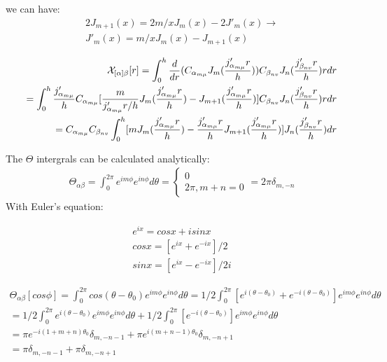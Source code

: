 \documentclass{Note}
\begin{document}
we can have:
\begin{equation}
\begin{aligned}
2J_{m+1}(x)=2m/x J_m(x)-2J'_m(x)\rightarrow \\
J'_m(x)=m/x J_m(x)-J_{m+1}(x)
\end{aligned}
\end{equation}

\begin{equation}
\begin{aligned}
\mathcal{X}_{[\alpha]\beta}[r]=\int_0^h {d\over dr}(C_{\alpha_{m\mu}} J_m({j'_{\alpha_{m\mu}}r\over h}))C_{\beta_{nv}} J_n({j'_{\beta_{nv}}r\over h})r dr\\
=\int_0^h {j'_{\alpha_{m\mu}}\over h} C_{\alpha_{m\mu}} [{m\over {j'_{\alpha_{m\mu}}r/ h}} J_m({j'_{\alpha_{m\mu}}r\over h})- J_{m+1}({j'_{\alpha_{m\mu}}r\over h})]C_{\beta_{nv}} J_n({j'_{\beta_{nv}}r\over h})r dr\\
=C_{\alpha_{m\mu}}C_{\beta_{nv}} \int_0^h[{m} J_m({j'_{\alpha_{m\mu}}r\over h})-{j'_{\alpha_{m\mu}}r\over h} J_{m+1}({j'_{\alpha_{m\mu}}r\over h})] J_n({j'_{\beta_{nv}}r\over h})dr\\
\end{aligned}
\end{equation}

The $\Theta$ intergrals can be calculated analytically:
\begin{equation}
\begin{aligned}
\Theta_{\alpha\beta}=\int_0^{2\pi} e^{im\phi} e^{in\phi} d\theta=\left\{\begin{matrix}
0\\
2\pi, m+n=0
\end{matrix}\right.
=2\pi \delta_{m,-n}
\end{aligned}
\end{equation}
With Euler's equation:

\begin{equation}
\begin{aligned}
e^{ix}=cosx+isinx\\
cosx=[e^{ix}+e^{-ix}]/2\\
sinx=[e^{ix}-e^{-ix}]/2i
\end{aligned}
\end{equation}

\begin{equation}
\begin{aligned}
\Theta_{\alpha\beta}[cos\phi]=\int_0^{2\pi} cos(\theta-\theta_0) e^{im\phi} e^{in\phi} d\theta=1/2\int_0^{2\pi} [e^{i(\theta-\theta_0)}+e^{-i(\theta-\theta_0)}] e^{im\phi} e^{in\phi} d\theta\\
=1/2\int_0^{2\pi} e^{i(\theta-\theta_0)} e^{im\phi} e^{in\phi} d\theta+1/2\int_0^{2\pi} [e^{-i(\theta-\theta_0)}] e^{im\phi} e^{in\phi} d\theta\\
=\pi e^{-i(1+m+n)\theta_0}\delta_{m,-n-1}+\pi e^{i(m+n-1)\theta_0}\delta_{m,-n+1}\\
=\pi \delta_{m,-n-1}+\pi \delta_{m,-n+1}
\end{aligned}
\end{equation}
\end{document}
